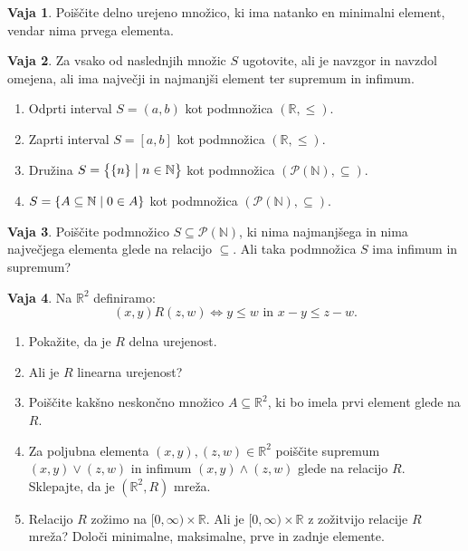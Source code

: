 \documentclass{article}
\newcommand{\pow}{\mathcal{P}}
\newcommand{\NN}{\mathbb{N}}
\newcommand{\RR}{\mathbb{R}}
\theoremstyle{definition}
\newtheorem{vaja}{Vaja}
\begin{document}
\begin{vaja}
  Poiščite delno urejeno množico, ki ima natanko en minimalni element, vendar nima prvega elementa.
\end{vaja}

\begin{vaja}
  Za vsako od naslednjih množic $S$ ugotovite, ali je navzgor in navzdol omejena, ali ima največji in najmanjši element ter supremum in infimum.
  \begin{enumerate}
    \item
      Odprti interval $S = (a,b)$ kot podmnožica $(\RR, \leq)$.
    \item
      Zaprti interval $S = [a,b]$ kot podmnožica $(\RR, \leq)$.
    \item
      Družina $S = \set[1]{\set{n}}{n \in \NN}$ kot podmnožica $(\pow(\NN), \subseteq)$.
    \item
      $S = \set{A \subseteq \NN}{0 \in A}$ kot podmnožica $(\pow(\NN), \subseteq)$.
  \end{enumerate}
\end{vaja}

\begin{vaja}
  Poiščite podmnožico $S \subseteq \pow(\NN)$, ki nima najmanjšega in nima največjega elementa glede na relacijo $\subseteq$. Ali taka podmnožica $S$ ima infimum in supremum?
\end{vaja}

\begin{vaja}
  Na $\RR^2$ definiramo:
  \[(x,y) R (z,w) \iff y \leq w \text{ in } x - y \leq z - w.\]
  \begin{enumerate}
    \item
      Pokažite, da je $R$ delna urejenost.
    \item
      Ali je $R$ linearna urejenost?
    \item
      Poiščite kakšno neskončno množico $A \subseteq \RR^2$, ki bo imela prvi element glede na $R$.
    \item
      Za poljubna elementa $(x,y), (z,w) \in \RR^2$ poiščite supremum $(x,y) \vee (z,w)$ in infimum $(x,y) \wedge (z,w)$ glede na relacijo $R$. Sklepajte, da je $(\RR^2, R)$ mreža.
    \item
      Relacijo $R$ zožimo na $[0, \infty) \times \RR$. Ali je $[0, \infty) \times \RR$ z zožitvijo relacije $R$ mreža? Določi minimalne, maksimalne, prve in zadnje elemente.
  \end{enumerate}
\end{vaja}
\end{document}
